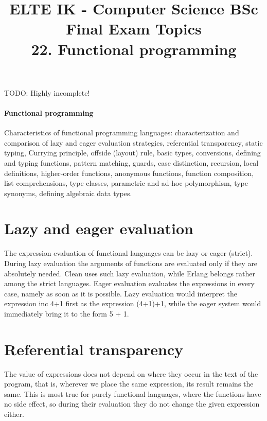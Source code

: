 \documentclass[margin=0px]{article}
\title{\textbf{{\Large ELTE IK - Computer Science BSc} \vspace{0.2cm} \\ {\huge Final Exam Topics}} \vspace{0.3cm} \\ 22. Functional programming}
\author{}
\date{}
\newenvironment{tetel}[1]{\paragraph{#1 \\}}{}
\begin{document}
\maketitle

\begin{center}
\end{center}

TODO: Highly incomplete!

\begin{tetel}{Functional programming}
    Characteristics of functional programming languages: characterization and comparison of lazy and eager evaluation strategies, referential transparency, static typing, Currying principle, offside (layout) rule, basic types, conversions, defining and typing functions, pattern matching, guards, case distinction, recursion, local definitions, higher-order functions, anonymous functions, function composition, list comprehensions, type classes, parametric and ad-hoc polymorphism, type synonyms, defining algebraic data types.
\end{tetel}

\section{Lazy and eager evaluation}
The expression evaluation of functional languages can be lazy or eager (strict). During lazy evaluation the arguments of functions are evaluated only if they are absolutely needed. Clean uses such lazy evaluation, while Erlang belongs rather among the strict languages. Eager evaluation evaluates the expressions in every case, namely as soon as it is possible. Lazy evaluation would interpret the expression inc 4+1 first as the expression (4+1)+1, while the eager system would immediately bring it to the form 5 + 1.

\section{Referential transparency}
The value of expressions does not depend on where they occur in the text of the program, that is, wherever we place the same expression, its result remains the same. This is most true for purely functional languages, where the functions have no side effect, so during their evaluation they do not change the given expression either.
\end{document}
